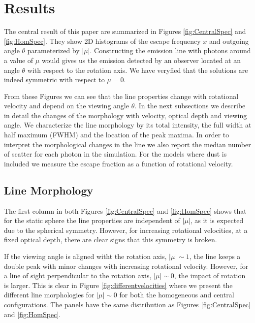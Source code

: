 \documentclass{emulateapj}
\newcommand{\ly}{{\ifmmode{{\rm Ly}\alpha~}\else{Ly$\alpha$~}\fi}}
\begin{document}
\section{Results}
\label{sec:results}

The central result of this paper are summarized in Figures
\ref{fig:CentralSpec} and \ref{fig:HomSpec}. They show 2D histograms
of the escape frequency $x$ and outgoing angle $\theta$ parameterized by
$|\mu|$. Constructing the emission line with photons around a value
of $\mu$ would gives us the emission detected by an observer located at an
angle $\theta$ with respect to the rotation axis. We have veryfied
that the solutions are indeed symmetric with respect to $\mu=0$.  

From these Figures we can see that the line properties change with
rotational velocity and depend on the viewing angle $\theta$.  In the
next subsections we describe in  detail the changes of the morphology
with velocity, optical depth and viewing angle. We characterize the
line morphology by its total intensity, the full width at half maximum
(FWHM) and the location of the peak maxima. In order to interpret the
morphological changes in the line we also report the median number of
scatter for each \ly photon in the simulation. For the models where
dust is included we measure the escape fraction as a function of
rotational velocity.  

\subsection{Line Morphology}
\label{sec:angles}

The first column in both Figures \ref{fig:CentralSpec} and
\ref{fig:HomSpec} shows that for the static sphere the line properties
are independent of $|\mu|$, as it is expected due
to the spherical symmetry. However, for increasing rotational
velocities, at a fixed optical depth, there are clear signs that this
symmetry is broken. 

If the viewing angle is aligned witht the rotation axis, $|\mu|\sim
1$, the \ly line keeps a double peak with minor changes with
increasing rotational velocity. However, for a line of sight
perpendicular to the rotation axis, $|\mu|\sim 0$, the impact of
rotation is larger. This is clear in  Figure
\ref{fig:differentvelocities} where we present the different line
morphologies for $|\mu|\sim 0$ for both the homogeneous and central
configurations. The panels have the same distribution as Figures
\ref{fig:CentralSpec} and \ref{fig:HomSpec}.   
\end{document}
